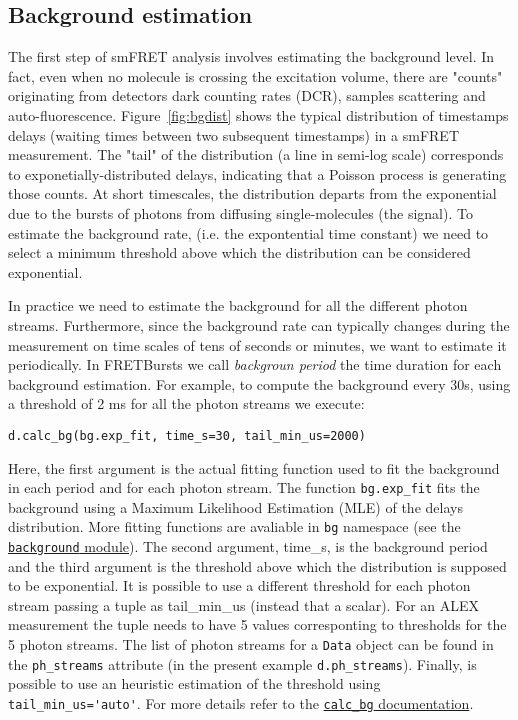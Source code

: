 \subsection{Background estimation}

The first step of smFRET analysis involves estimating the background level. In fact,  even when no molecule is crossing the excitation volume, there are "counts" originating from detectors dark counting rates (DCR), samples scattering and auto-fluorescence. Figure~\ref{fig:bgdist} shows the typical distribution of timestamps delays (waiting times between two subsequent timestamps) in a smFRET measurement. The "tail" of the distribution (a line in semi-log scale) corresponds to exponetially-distributed delays, indicating that a Poisson process is generating those counts. At short timescales, the distribution departs from the exponential due to the bursts of photons from diffusing single-molecules (the signal).
To estimate the background rate, (i.e. the expontential time constant) we need to select a minimum threshold above which the distribution can be considered exponential. 

In practice we need to estimate the background for all the different photon streams. Furthermore, since the background rate can typically changes during the measurement on time scales of tens of seconds or minutes, we want to estimate it periodically. 
In FRETBursts we call \textit{backgroun period} the time duration for each background estimation. For example, to compute the background every 30s, using a threshold of 2 ms for all the photon streams we execute:

\verb|d.calc_bg(bg.exp_fit, time_s=30, tail_min_us=2000)|

Here, the first argument is the actual fitting function used to fit the background in each period and for each photon stream. The function \verb|bg.exp_fit| fits the background using a Maximum Likelihood Estimation (MLE) of the delays distribution. More fitting functions are avaliable in \verb|bg| namespace (see the \href{http://fretbursts.readthedocs.org/en/latest/background.html}{\verb|background| module}). The second argument, time_s, is the background period and the third argument is the threshold above which the distribution is supposed to be exponential. It is possible to use a different threshold for each photon stream passing a tuple as tail_min_us (instead that a scalar). For an ALEX measurement the tuple needs to have 5 values corresponting to thresholds for the 5 photon streams. The list of photon streams for a \verb|Data| object can be found in the \verb|ph_streams| attribute (in the present example \verb|d.ph_streams|). Finally, is possible to use an heuristic estimation of the threshold using \verb|tail_min_us='auto'|. For more details refer to the \href{http://fretbursts.readthedocs.org/en/latest/data_class.html#fretbursts.burstlib.Data.calc_bg}{\verb|calc_bg| documentation}.

